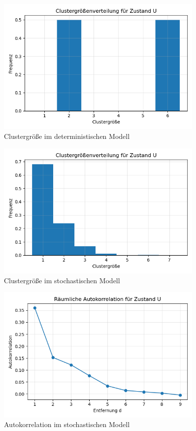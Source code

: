 \documentclass{SeminarV2}
\begin{document}
\begin{figure}[htbp]
  \centering
  \includegraphics[width=0.9\textwidth]{images/Cluster_det.png}
  \caption{Clustergröße im deterministischen Modell}
  \label{fig:cpg_states_cluster_det}
  \end{figure}
\begin{figure}[htbp]
  \centering
  \includegraphics[width=0.9\textwidth]{images/Cluster_stoch.png}
  \caption{Clustergröße im stochastischen Modell}
  \label{fig:cpg_states_cluster_stoch}
  \end{figure}


\begin{figure} [htbp]
  \centering
  \includegraphics[width=0.9\textwidth]{images/Autokor_stoch.png}
  \caption{Autokorrelation im stochastischen Modell}
  \label{fig:cpg_states_auto_stoch}
  \end{figure}
\end{document}
